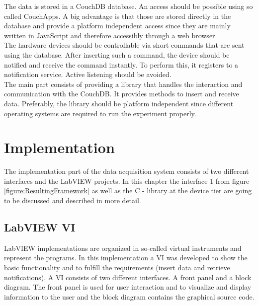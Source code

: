 The data is stored in a CouchDB database. An access should be possible using so called CouchApps. A big advantage is that those are stored directly in the database and provide a platform independent access since they are mainly written in JavaScript and therefore accessibly through a web browser.\\

The hardware devices should be controllable via short commands that are sent using the database. After inserting such a command, the device should be notified and receive the command instantly. To perform this, it registers to a notification service. Active listening should be avoided.\\

The main part consists of providing a library that handles the interaction and communication with the CouchDB. It provides methods to insert and receive data. Preferably, the library should be platform independent since different operating systems are required to run the experiment properly.\\

\section{Implementation}
\label{section:implementation}
The implementation part of the data acquisition system consists of two different interfaces and the LabVIEW projects. In this chapter the interface 1 from figure \ref{figure:ResultingFramework} as well as the C - library at the device tier are going to be discussed and described in more detail. 

\subsection{LabVIEW VI}
LabVIEW implementations are organized in so-called virtual instruments and represent the programs. In this implementation a VI was developed to show the basic functionality and to fulfill the requirements (insert data and retrieve notifications). A VI consists of two different interfaces. A front panel and a block diagram. The front panel is used for user interaction and to visualize and display information to the user and the block diagram contains the graphical source code. 

